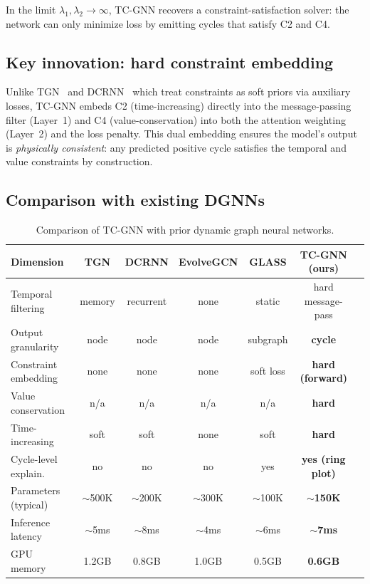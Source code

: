 \documentclass[journal,onecolumn]{IEEEtran}
\begin{document}
In the limit $\lambda_1, \lambda_2 \to \infty$, \textsc{TC-GNN}
recovers a constraint-satisfaction solver: the network can only minimize
loss by emitting cycles that satisfy C2 and C4.

\subsection{Key innovation: hard constraint embedding}
\label{sec:model-hard}

Unlike \textsc{TGN}~\cite{tgn2020} and \textsc{DCRNN}~\cite{dcrnn2018}
which treat constraints as soft priors via auxiliary losses, TC-GNN
embeds C2 (time-increasing) directly into the message-passing filter
(Layer~1) and C4 (value-conservation) into both the attention weighting
(Layer~2) and the loss penalty. This dual embedding ensures the model's
output is \emph{physically consistent}: any predicted positive cycle
satisfies the temporal and value constraints by construction.

\subsection{Comparison with existing DGNNs}
\label{sec:model-vs}

\begin{table}[t]
\centering
\caption{Comparison of \textsc{TC-GNN} with prior dynamic graph neural networks.}
\label{tab:comparison}
\small
\begin{tabular}{lcccccc}
\toprule
\textbf{Dimension} & \textbf{TGN} & \textbf{DCRNN} & \textbf{EvolveGCN} & \textbf{GLASS} & \textbf{TC-GNN (ours)} \\
\midrule
Temporal filtering   & memory & recurrent & none & static & hard message-pass \\
Output granularity   & node & node & node & subgraph & \textbf{cycle} \\
Constraint embedding & none & none & none & soft loss & \textbf{hard (forward)} \\
Value conservation   & n/a   & n/a   & n/a   & n/a   & \textbf{hard} \\
Time-increasing      & soft  & soft  & none  & soft  & \textbf{hard} \\
Cycle-level explain. & no    & no    & no    & yes   & \textbf{yes (ring plot)} \\
Parameters (typical) & $\sim$500K & $\sim$200K & $\sim$300K & $\sim$100K & \textbf{$\sim$150K} \\
Inference latency    & $\sim$5ms & $\sim$8ms & $\sim$4ms & $\sim$6ms & \textbf{$\sim$7ms} \\
GPU memory           & 1.2GB & 0.8GB & 1.0GB & 0.5GB & \textbf{0.6GB} \\
\bottomrule
\end{tabular}
\end{table}
\end{document}
